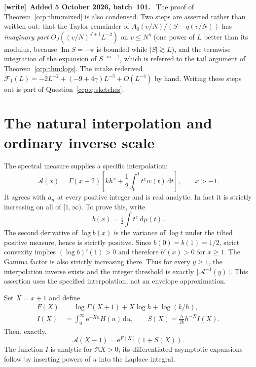 \documentclass[11pt,letterpaper]{article}
\theoremstyle{remark}\newtheorem{remark}[theorem]{Remark}
\newcommand{\dd}{\,\mathrm d}
\newcommand{\im}{\operatorname{Im}}
\newcommand{\ee}{\mathrm e}
\newenvironment{writenote}[1][]{\par\smallskip\begingroup\small
 \noindent\textbf{[write]}\if\relax\detokenize{#1}\relax\else~\textbf{#1.}\fi\ }%
 {\par\endgroup\smallskip}
\begin{document}
\begin{writenote}[Added 5 October 2026, batch~101]
The proof of Theorem~\ref{ccp:thm:mixed} is also condensed. Two steps are
asserted rather than written out: that the Taylor remainder of
$A_0(v/N)/(S-q(v/N))$ has \emph{imaginary part} $O_J((v/N)^{J+1}L^{-2})$
on $v\le N^\eta$ (one power of $L$ better than its modulus, because
$\im S=-\pi$ is bounded while $|S|\gtrsim L$), and the termwise integration
of the expansion of $S^{-m-1}$, which is referred to the tail argument of
Theorem~\ref{ccp:thm:logs}. The intake rederived $\mathcal
F_1(L)=-2L^{-2}+(-9+4\gamma)L^{-3}+O(L^{-4})$ by hand. Writing these steps
out is part of Question~\ref{ccp:q:sketches}.
\end{writenote}

\section{The natural interpolation and ordinary inverse scale}\label{ccp:sec:interp}
The spectral measure supplies a specific interpolation:
\begin{equation}
\mathcal A(x)=\Gamma(x+2)\left[kh^x+\frac12\int_0^1t^xw(t)\dd t\right],
\qquad x>-1.\label{ccp:eq:interp}
\end{equation}
It agrees with $a_n$ at every positive integer and is real analytic. In fact it is strictly increasing on all of $[1,\infty)$. To prove this, write
\[
b(x)=\tfrac12\int t^x\dd\mu(t).
\]
The second derivative of $\log b(x)$ is the variance of $\log t$ under the tilted positive measure, hence is strictly positive. Since $b(0)=b(1)=1/2$, strict convexity implies $(\log b)'(1)>0$ and therefore $b'(x)>0$ for $x\ge1$. The Gamma factor is also strictly increasing there. Thus for every $y\ge1$, the interpolation inverse exists and the integer threshold is exactly $\lceil\mathcal A^{-1}(y)\rceil$. This assertion uses the specified interpolation, not an envelope approximation.

Set $X=x+1$ and define
\begin{align}
F(X)&=\log\Gamma(X+1)+X\log h+\log(k/h),\label{ccp:eq:envelopeF}\\
I(X)&=\int_0^\infty\ee^{-Xu}H(u)\dd u,\qquad
S(X)=\frac h{2k}h^{-X}I(X).\label{ccp:eq:S}
\end{align}
Then, exactly,
\begin{equation}
\mathcal A(X-1)=\ee^{F(X)}(1+S(X)).\label{ccp:eq:exactinverse}
\end{equation}
The function $I$ is analytic for $\Re X>0$; its differentiated asymptotic expansions follow by inserting powers of $u$ into the Laplace integral.
\end{document}
